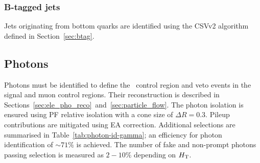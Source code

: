 \subsubsection{B-tagged jets}

Jets originating from bottom quarks are identified using the CSVv2 algorithm defined in Section~\ref{sec:btag}. 

\subsection{Photons}

Photons must be identified to define the \gj~control region and veto events in the signal and
muon control regions. Their reconstruction is described in Sections~\ref{sec:ele_pho_reco}~and~\ref{sec:particle_flow}. The photon isolation is 
ensured using PF relative isolation with a cone size of $\Delta R = 0.3$. Pileup contributions 
are mitigated using EA correction. Additional selections are summarised 
in Table~\ref{tab:photon-id-gamma}; an efficiency for photon identification of $\sim71\%$
is achieved. The number of fake and non-prompt photons passing selection is measured as $2-10\%$ depending on $\mbox{$H_\text{T}$}$.

